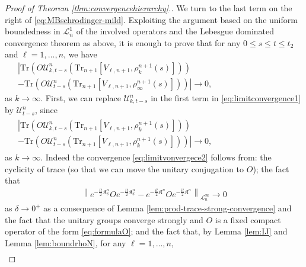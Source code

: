\begin{proof}[Proof of Theorem \ref{thm:convergencehierarchy}.]
  We turn to the last term on the right of \eqref{eq:MBschrodinger-mild}.
  Exploiting the argument based on the uniform boundedness in
  $\mathcal{L}^1_n$ of the involved operators and the Lebesgue dominated
  convergence theorem as above, it is enough to prove that for any $0
  \leqslant s \leqslant t \leqslant t_2$ and $\ell = 1, \ldots, n$, we have
  \begin{align}
    \left| \mathrm{Tr} \left(O \mathcal{U}^n_{k, t - s} \left(\mathrm{Tr}_{n + 1}
    [V_{\ell, n + 1}, \rho^{n + 1}_k (s)]\right)\right) \qquad\qquad\qquad\qquad\qquad\qquad \right. \nonumber\\
     - \left. \mathrm{Tr} \left(O
    \mathcal{U}^n_{t - s} \left(\mathrm{Tr}_{n + 1} [V_{\ell, n + 1}, \rho^{n +
    1}_{\infty} (s)]\right)\right) \right| \rightarrow 0, \label{eq:limitconvergence1}
  \end{align}
  as $k \rightarrow \infty$. First, we can replace $\mathcal{U}^n_{k, t - s}$
  in the first term in \eqref{eq:limitconvergence1} by $\mathcal{U}^n_{t -
  s}$, since
  \begin{align}
  \begin{split}
    \left| \mathrm{Tr} \left(O \mathcal{U}^n_{k, t - s} \left(\mathrm{Tr}_{n + 1}
    [V_{\ell, n + 1}, \rho^{n + 1}_k (s)]\right)\right) \qquad\qquad\qquad\qquad\qquad\qquad \right.\\
   \left. - \mathrm{Tr} \left(O
    \mathcal{U}^n_{t - s} \left(\mathrm{Tr}_{n + 1} [V_{\ell, n + 1}, \rho^{n + 1}_k
    (s)]\right)\right) \right| \rightarrow 0, \label{eq:limitvonvergece2}
    \end{split}
  \end{align}
  as $k \rightarrow \infty$. Indeed the convergence
  \eqref{eq:limitvonvergece2} follows from: the cyclicity of trace (so that we can move the unitary conjugation to $O$); the fact
  that
  \begin{align*}
   \left\| e^{- \frac{i t}{2} \mathfrak{K}^n_{\delta}} Oe^{- \frac{i t}{2} \mathfrak{K}^n_{\delta}} - e^{- \frac{i t}{2} \mathfrak{K}^n} Oe^{- \frac{i t}{2} \mathfrak{K}^n} \right\|_{\mathcal{L}^{\infty}_n}
     \rightarrow 0
  \end{align*}
  as $\delta \rightarrow 0^+$ as a consequence of Lemma
  \ref{lem:prod-trace-strong-convergence} and the fact that the unitary groups converge strongly and $O$ is a fixed compact
  operator of the form \eqref{eq:formulaO}; and the fact that, by Lemma
  \ref{lem:IJ} and Lemma \ref{lem:boundrhoN}, for any $\ell = 1, \ldots,
  n$,
  \begin{eqnarray*}

\end{eqnarray*}
\end{proof}
